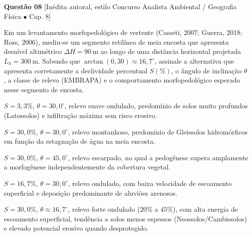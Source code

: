 \vspace{6pt}
\noindent\textbf{Questão 08} {\footnotesize\color{uefsMuted}[Inédita autoral, estilo Concurso Analista Ambiental / Geografia Física $\bullet$ Cap. 8]}\par
Em um levantamento morfopedológico de vertente (Casseti, 2007; Guerra, 2018; Ross, 2006), mediu-se um segmento retilíneo de meia encosta que apresenta desnível altimétrico $\Delta H = 90\ \text{m}$ ao longo de uma distância horizontal projetada $L_h = 300\ \text{m}$. Sabendo que $\arctan(0,30) \approx 16,7^\circ$, assinale a alternativa que apresenta corretamente a declividade percentual $S(\%)$, o ângulo de inclinação $\theta$, a classe de relevo (EMBRAPA) e o comportamento morfopedológico esperado nesse segmento de encosta.
\begin{alternativas}
  \item $S = 3,3\%$, $\theta = 30,0^\circ$, relevo suave ondulado, predomínio de solos muito profundos (Latossolos) e infiltração máxima sem risco erosivo.
  \item $S = 30,0\%$, $\theta = 30,0^\circ$, relevo montanhoso, predomínio de Gleissolos hidromórficos em função da estagnação de água na meia encosta.
  \item $S = 30,0\%$, $\theta = 45,0^\circ$, relevo escarpado, no qual a pedogênese supera amplamente a morfogênese independentemente da cobertura vegetal.
  \item $S = 16,7\%$, $\theta = 30,0^\circ$, relevo ondulado, com baixa velocidade de escoamento superficial e deposição predominante de aluviões arenosos.
  \item $S = 30,0\%$, $\theta \approx 16,7^\circ$, relevo forte ondulado ($20\%$ a $45\%$), com alta energia de escoamento superficial, tendência a solos menos espessos (Neossolos/Cambissolos) e elevado potencial erosivo quando desprotegido.
\end{alternativas}

